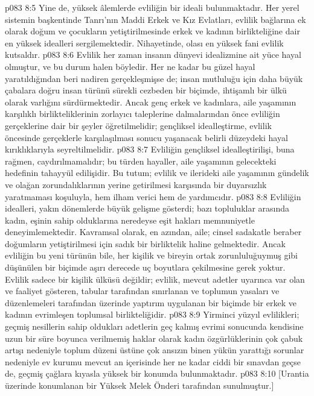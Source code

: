 \vs p083 8:5 Yine de, yüksek âlemlerde evliliğin bir ideali bulunmaktadır. Her yerel sistemin başkentinde Tanrı’nın Maddi Erkek ve Kız Evlatları, evlilik bağlarına ek olarak doğum ve çocukların yetiştirilmesinde erkek ve kadının birlikteliğine dair en yüksek idealleri sergilemektedir. Nihayetinde, olası en yüksek fani evlilik  kutsaldır.
\vs p083 8:6 Evlilik her zaman insanın dünyevi idealizmine ait yüce hayal olmuştur, ve bu durum halen böyledir. Her ne kadar bu güzel hayal yaratıldığından beri nadiren gerçekleşmişse de; insan mutluluğu için daha büyük çabalara doğru insan türünü sürekli cezbeden bir biçimde, ihtişamlı bir ülkü olarak varlığını sürdürmektedir. Ancak genç erkek ve kadınlara, aile yaşamının karşılıklı birlikteliklerinin zorlayıcı taleplerine dalmalarından önce evliliğin gerçeklerine dair bir şeyler öğretilmelidir; gençliksel idealleştirme, evlilik öncesinde gerçeklerle karşılaşılması sonucu yaşanacak belirli düzeydeki hayal kırıklıklarıyla seyreltilmelidir.
\vs p083 8:7 Evliliğin gençliksel idealleştirilişi, buna rağmen, caydırılmamalıdır; bu türden hayaller, aile yaşamının gelecekteki hedefinin tahayyül edilişidir. Bu tutum; evlilik ve ilerideki aile yaşamının gündelik ve olağan zorundalıklarının yerine getirilmesi karşısında bir duyarsızlık yaratmaması koşuluyla, hem ilham verici hem de yardımcıdır.
\vs p083 8:8 Evliliğin idealleri, yakın dönemlerde büyük gelişme gösterdi; bazı topluluklar arasında kadın, eşinin sahip olduklarına neredeyse eşit hakları memnuniyetle deneyimlemektedir. Kavramsal olarak, en azından, aile; cinsel sadakatle beraber doğumların yetiştirilmesi için sadık bir birliktelik haline gelmektedir. Ancak evliliğin bu yeni türünün bile, her kişilik ve bireyin ortak zorunluluğuymuş gibi düşünülen bir biçimde aşırı derecede uç boyutlara çekilmesine gerek yoktur. Evlilik sadece bir kişilik ülküsü değildir; evlilik, mevcut adetler uyarınca var olan ve faaliyet gösteren, tabular tarafından sınırlanan ve toplumun yasaları ve düzenlemeleri tarafından üzerinde yaptırım uygulanan bir biçimde bir erkek ve kadının evrimleşen toplumsal birlikteliğidir.
\vs p083 8:9 Yirminci yüzyıl evlilikleri; geçmiş nesillerin sahip oldukları adetlerin geç kalmış evrimi sonucunda kendisine uzun bir süre boyunca verilmemiş haklar olarak kadın özgürlüklerinin çok çabuk artışı nedeniyle toplum düzeni üstüne çok ansızın binen yükün yarattığı sorunlar nedeniyle ev kurumu mevcut an içerisinde her ne kadar ciddi bir sınavdan geçse de, geçmiş çağlara kıyasla yüksek bir konumda bulunmaktadır.
\vs p083 8:10 [Urantia üzerinde konumlanan bir Yüksek Melek Önderi tarafından sunulmuştur.]
